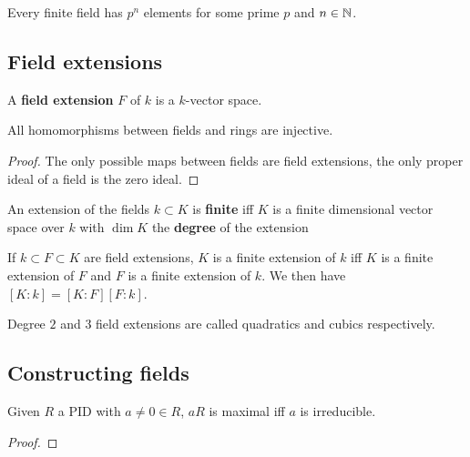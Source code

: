 \documentclass[../Year2.tex]{subfiles}
\begin{document}
\begin{theorem}
    Every finite field has $p^n$ elements for some prime $p$ and $n\in\mathbb{N}$.
\end{theorem}

\subsection{Field extensions}

\begin{definition}
    A \textbf{field extension} $F$ of $k$ is a $k$-vector space.
\end{definition}

\begin{proposition}
    All homomorphisms between fields and rings are injective.
    \begin{proof}
        The only possible maps between fields are field extensions, the only proper ideal of a field is the zero ideal.
    \end{proof}
\end{proposition}

\begin{definition}
    An extension of the fields $k\subset K$ is \textbf{finite} iff $K$ is a finite dimensional vector space over $k$ with $\dim K$ the \textbf{degree} of the extension
\end{definition}

\begin{theorem}
    If $k\subset F\subset K$ are field extensions, $K$ is a finite extension of $k$ iff $K$ is a finite extension of $F$ and $F$ is a finite extension of $k$. We then have $[K:k]=[K:F][F:k]$.
\end{theorem}

\begin{remark}
    Degree $2$ and $3$ field extensions are called quadratics and cubics respectively.
\end{remark}

\subsection{Constructing fields}

\begin{lemma}
    Given $R$ a PID with $a\neq0\in R$, $aR$ is maximal iff $a$ is irreducible.
    \begin{proof}
        
    \end{proof}
\end{lemma}
\end{document}
